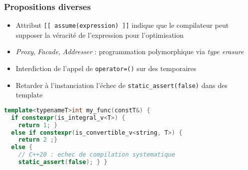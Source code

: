 \documentclass[C++.tex]{subfiles}
\begin{document}
\begin{frame}[fragile]
	\frametitle{Propositions diverses}
	\begin{itemize}
		\item Attribut \lstinline|[[ assume(expression) ]]| indique que le compilateur peut supposer la véracité de l'expression pour l'optimisation
		\item\textit{Proxy}, \textit{Facade}, \textit{Addresser} : programmation polymorphique via \textit{type erasure}


		\item Interdiction de l'appel de \lstinline|operator=()| sur des temporaires


		\item Retarder à l'instanciation l'échec de \lstinline|static_assert(false)| dans des template
	\end{itemize}

	\begin{lstlisting}[language=C++]
template<typenameT>int my_func(constT&) {
  if constexpr(is_integral_v<T>) { 
    return 1; } 
  else if constexpr(is_convertible_v<string, T>) { 
    return 2 ;}
  else {
    // C++20 : echec de compilation systematique
    static_assert(false); } }\end{lstlisting}

\end{frame}
\end{document}
